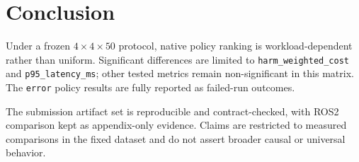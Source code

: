 \section{Conclusion}
Under a frozen \(4 \times 4 \times 50\) protocol, native policy ranking is workload-dependent rather than uniform.
Significant differences are limited to \texttt{harm\_weighted\_cost} and \texttt{p95\_latency\_ms};
other tested metrics remain non-significant in this matrix.
The \texttt{error} policy results are fully reported as failed-run outcomes.

The submission artifact set is reproducible and contract-checked, with ROS2 comparison kept as appendix-only evidence.
Claims are restricted to measured comparisons in the fixed dataset and do not assert broader causal or universal behavior.
